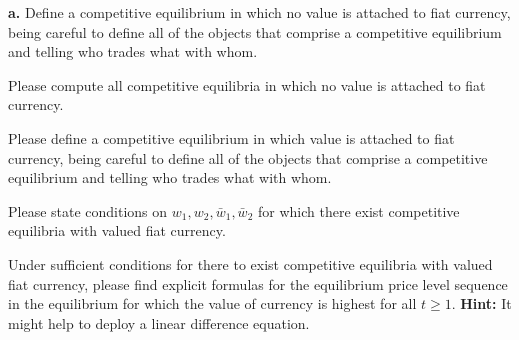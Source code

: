 \medskip
\noindent 
{\bf a.} Define a competitive equilibrium in which no value is attached to fiat currency, being careful to define all
of the objects that comprise a competitive equilibrium and telling who trades what with whom.

\medskip
{} Please compute all competitive equilibria in which no value is attached to fiat currency.

\medskip
{} Please define a competitive equilibrium in which value is attached to fiat currency, 
being careful to define all
of the objects that comprise a competitive equilibrium and telling who trades what with whom.

\medskip
{} Please state conditions on $w_1, w_2, \bar w_1, \bar w_2$ for which there exist competitive
equilibria with valued fiat currency.

\medskip
{} Under sufficient conditions for there to exist competitive equilibria with valued fiat currency,
please find explicit formulas for the equilibrium price level sequence in the equilibrium for which the value
of currency is highest for all $t \geq 1$. {\bf Hint:} It might help to deploy a linear difference equation.




\medskip
\bye

